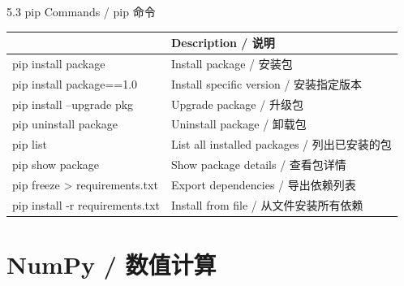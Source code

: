 \documentclass[11pt,a4paper]{report}
\begin{document}
\begin{cmdsection}{5.3  pip Commands / pip 命令}
\normalsize\renewcommand{\arraystretch}{1.4}
\centering
\begin{tabularx}{\textwidth}{@{}>{\ttfamily}l>{\raggedright\arraybackslash}X@{}}
\toprule
\multicolumn{1}{@{}l}{\textbf{Command (Terminal)}} & \textbf{Description / 说明} \\ \midrule
pip install package         & Install package / 安装包 \\
pip install package==1.0    & Install specific version / 安装指定版本 \\
pip install --upgrade pkg   & Upgrade package / 升级包 \\
pip uninstall package       & Uninstall package / 卸载包 \\
pip list                    & List all installed packages / 列出已安装的包 \\
pip show package            & Show package details / 查看包详情 \\
pip freeze > requirements.txt & Export dependencies / 导出依赖列表 \\
pip install -r requirements.txt & Install from file / 从文件安装所有依赖 \\
\bottomrule
\end{tabularx}
\end{cmdsection}

\newpage

\chapter{NumPy / 数值计算}
\end{document}
